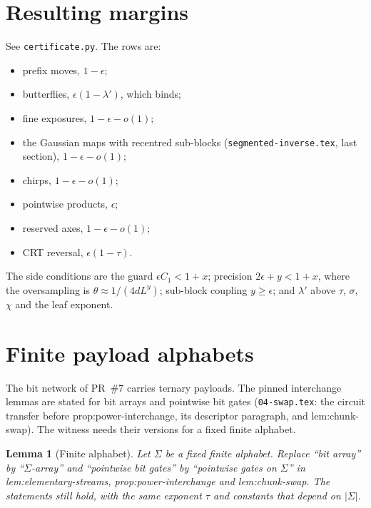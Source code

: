 \documentclass[11pt]{article}
\newtheorem{lemma}{Lemma}
\theoremstyle{remark}\newtheorem*{remark}{Remark}
\begin{document}
\section{Resulting margins}
See \texttt{certificate.py}. The rows are:
\begin{itemize}
\item prefix moves, $1-\epsilon$;
\item butterflies, $\epsilon(1-\lambda')$, which binds;
\item fine exposures, $1-\epsilon-o(1)$;
\item the Gaussian maps with recentred sub-blocks (\texttt{segmented-inverse.tex}, last section), $1-\epsilon-o(1)$;
\item chirps, $1-\epsilon-o(1)$;
\item pointwise products, $\epsilon$;
\item reserved axes, $1-\epsilon-o(1)$;
\item CRT reversal, $\epsilon(1-\tau)$.
\end{itemize}
The side conditions are the guard $\epsilon C_1<1+x$; precision $2\epsilon+y<1+x$, where the oversampling is $\theta\approx1/(4dL^y)$; sub-block coupling $y\ge\epsilon$; and
$\lambda'$ above $\tau$, $\sigma$, $\chi$ and the leaf exponent.


\appendix
\section{Finite payload alphabets}

The bit network of PR~\#7 carries ternary payloads. The pinned interchange lemmas are stated for
bit arrays and pointwise bit gates (\texttt{04-swap.tex}: the circuit transfer before
prop:power-interchange, its descriptor paragraph, and lem:chunk-swap). The witness needs their
versions for a fixed finite alphabet.

\begin{lemma}[Finite alphabet]\label{lem:finite-alphabet}
Let $\Sigma$ be a fixed finite alphabet. Replace ``bit array'' by ``$\Sigma$-array'' and ``pointwise
bit gates'' by ``pointwise gates on $\Sigma$'' in lem:elementary-streams, prop:power-interchange
and lem:chunk-swap. The statements still hold, with the same exponent $\tau$ and constants that
depend on $|\Sigma|$.
\end{lemma}
\end{document}
